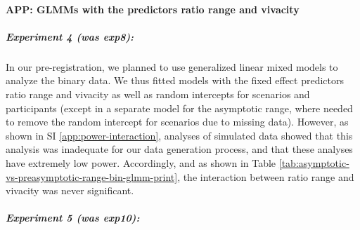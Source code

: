 \documentclass[
]{article}
\begin{document}
\clearpage

\paragraph{APP: GLMMs with the predictors ratio range and vivacity}\label{app:glmm-ratio-range-vivacity}

\subparagraph{Experiment 4 (was exp8):}\label{experiment-4-was-exp8-1}

In our pre-registration, we planned to use generalized linear mixed models to analyze the binary data. We thus fitted models with the fixed effect predictors ratio range and vivacity as well as random intercepts for scenarios and participants (except in a separate model for the asymptotic range, where needed to remove the random intercept for scenarios due to missing data). However, as shown in SI \ref{app:power-interaction}, analyses of simulated data showed that this analysis was inadequate for our data generation process, and that these analyses have extremely low power. Accordingly, and as shown in Table \ref{tab:asymptotic-vs-preasymptotic-range-bin-glmm-print}, the interaction between ratio range and vivacity was never significant.

\subparagraph{Experiment 5 (was exp10):}\label{experiment-5-was-exp10-1}

\begingroup\fontsize{6}{8}\selectfont
\end{document}
